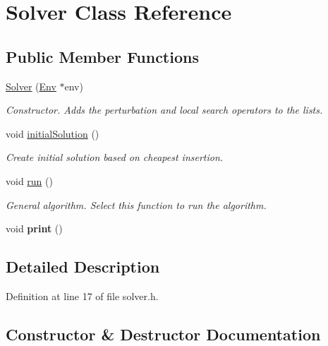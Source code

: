\hypertarget{class_solver}{}\section{Solver Class Reference}
\label{class_solver}
\subsection*{Public Member Functions}
\begin{DoxyCompactItemize}
\item 
\hyperlink{class_solver_a05ec0ef6028f51c1eba417b41a14c2ea}{Solver} (\hyperlink{class_env}{Env} $\ast$env)
\begin{DoxyCompactList}\small\item\em Constructor. Adds the perturbation and local search operators to the lists. \end{DoxyCompactList}\item 
\mbox{\label{class_solver_a4b0fc2950022b5e5166b6d3f0564696f}} 
void \hyperlink{class_solver_a4b0fc2950022b5e5166b6d3f0564696f}{initial\+Solution} ()
\begin{DoxyCompactList}\small\item\em Create initial solution based on cheapest insertion. \end{DoxyCompactList}\item 
\mbox{\label{class_solver_a1f31e2d38dacd7e828c1bf428eb2ed96}} 
void \hyperlink{class_solver_a1f31e2d38dacd7e828c1bf428eb2ed96}{run} ()
\begin{DoxyCompactList}\small\item\em General algorithm. Select this function to run the algorithm. \end{DoxyCompactList}\item 
\mbox{\label{class_solver_a39ebda60ffaadddc1c4f85bd6cf9209c}} 
void {\bfseries print} ()
\end{DoxyCompactItemize}


\subsection{Detailed Description}


Definition at line 17 of file solver.\+h.



\subsection{Constructor \& Destructor Documentation}
\mbox{\label{class_solver_a05ec0ef6028f51c1eba417b41a14c2ea}} 
